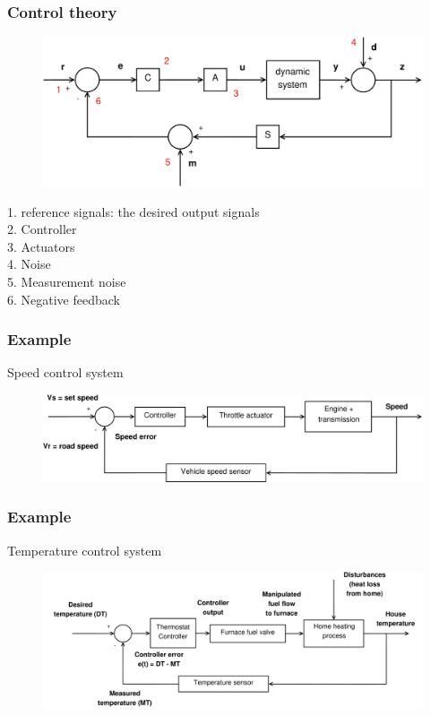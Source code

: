\documentclass{beamer}
\begin{document}
\begin{frame}
\frametitle{Control theory}
\begin{figure}
\includegraphics[width=.8\linewidth]{full_system2}
\end{figure}
\vspace{-2ex}
1. reference signals: the desired output signals\\
2. Controller\\
3. Actuators\\
4. Noise\\
5. Measurement noise\\
6. Negative feedback
\end{frame}


\begin{frame}
\frametitle{Example}
\vspace{-6ex}
Speed control system\\
\bigskip
\bigskip
\begin{figure}
\includegraphics[width=1\linewidth]{speed_control_system}
\end{figure}
\end{frame}


\begin{frame}
\frametitle{Example}
\vspace{-3ex}
Temperature control system\\
\bigskip
\begin{figure}
\includegraphics[width=1\linewidth]{temp_control_system}
\end{figure}
\end{frame}
\end{document}
